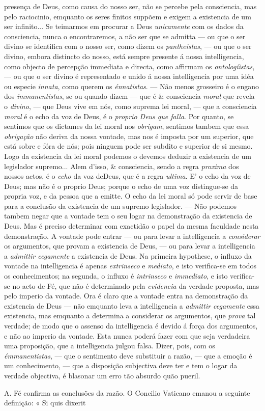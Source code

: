 presença de Deus, como causa do nosso ser, não se percebe pela consciencia, mas pelo raciocinio, emquanto os seres finitos suppõem e exigem a existencia de um ser infinito... Se teimarmos em procurar a Deus \emph{unicamente} com os dados da consciencia, nunca o encontraremos, a não ser que se admitta --- ou que o ser divino se identifica com o nosso ser, como dizem os \emph{pantheistas}, --- ou que o ser divino, embora distincto do nosso, está sempre presente á nossa intelligencia, como objecto de percepção immediata e directa, como affirmam os \emph{ontologíistas}, --- ou que o ser divino é representado e unido á nossa intelligencia por uma idéa ou especie \emph{innata}, como querem os \emph{énnatistas}. --- Não menos grosseiro é o engano dos \emph{immanentistas}, se ou quando dizem --- que é \& consciencia \emph{moral} que revela o \emph{divino}, --- que Deus vive em nós, como suprema lei moral, --- que a consciencia \emph{moral} é o echo da voz de Deus, é o \emph{proprio Deus que falla}. Por quanto, se sentimos que os dictames da lei moral nos \emph{obrigam}, sentimos tambem que essa \emph{obrigação} não deriva da nossa vontade, mas nos é imposta por um superior, que está sobre e fóra de nós; pois ninguem pode ser subdito e superior de si mesmo. Logo da existencia da lei moral podemos o devemos deduzir a existencia de um legislador supremo... Alem d'isso, \& consciencia, sendo a regra \emph{proxima} dos nossos actos, é o \emph{echo} da voz deDeus, que é a regra \emph{ultima}. E' o echo da voz de Deus; mas não é o proprio Deus; porque o echo de uma voz distingue-se da propria voz, e da pessoa que a emitte. O echo da lei moral só pode servir de base para a conclusão da existencia de um supremo legislador. --- Não podemos tambem negar que a vontade tem o seu logar na demonstração da existencia de Deus. Mas é preciso determinar com exactidão o papel da mesma faculdade nesta demonstração. A vontade pode entrar --- ou para levar a intelligencia a \emph{considerar} os argumentos, que provam a existencia de Deus, --- ou para levar a intelligencia a \emph{admittir cegamente} a existencia de Deus. Na primeira hypothese, o influxo da vontade na intelligencia é apenas \emph{extrinseco} e \emph{mediato}, e isto verifica-se em todos os conhecimentos; na segunda, o influxo é \emph{intrinseco} e \emph{immediato}, e isto verifica-se no acto de Fé, que não é determinado pela \emph{evidencia} da verdade proposta, mas pelo imperio da vontade. Ora é claro que a vontade entra na demonstração da existencia de Deus --- não emquanto leva a intelligencia a \emph{admittir cegamente} essa existencia, mas emquanto a determina a considerar os argumentos, que \emph{prova} tal verdade; de modo que o assenso da intelligencia é devido á força dos argumentos, e não ao imperio da vontade. Esta nunca poderá fazer com que seja verdadeira uma proposição, que a intelligencia julgou falsa. Dizer, pois, com os \emph{émmanentistas}, --- que o sentimento deve substituir a razão, --- que a emoção é um conhecimento, --- que a disposição subjectiva deve ter e tem o logar da verdade objectiva, é blasonar um erro tão absurdo quão pueril.\par A. Fé confirma as conclusões da razão. O Concilio Vaticano emanou a seguinte definição: « Si quis dixerit 